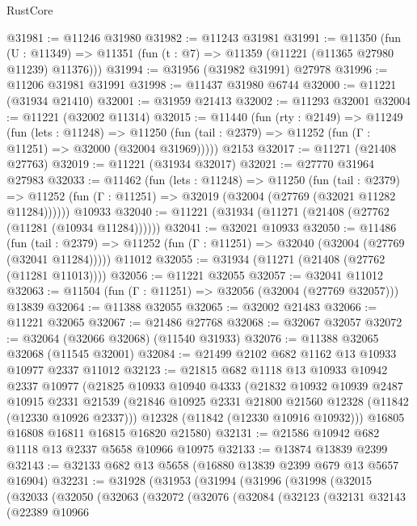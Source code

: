 \begin{lexlean}{RustCore}
\begin{coremodule}
@31981 := @11246 @31980
@31982 := @11243 @31981
@31991 := @11350
    (fun (U : @11349) => @11351 (fun (t : @7) => @11359 (@11221 (@11365 @27980 @11239) @11376)))
@31994 := @31956 (@31982 @31991) @27978
@31996 := @11206 @31981 @31991
@31998 := @11437 @31980 @6744
@32000 := @11221 (@31934 @21410)
@32001 := @31959 @21413
@32002 := @11293 @32001
@32004 := @11221 (@32002 @11314)
@32015 := @11440
    (fun (rty : @2149) =>
    @11249
      (fun (lets : @11248) =>
      @11250 (fun (tail : @2379) => @11252 (fun (Γ : @11251) => @32000 (@32004 @31969)))))
    @2153
@32017 := @11271 (@21408 @27763)
@32019 := @11221 (@31934 @32017)
@32021 := @27770 @31964 @27983
@32033 := @11462
    (fun (lets : @11248) =>
    @11250
      (fun (tail : @2379) =>
      @11252 (fun (Γ : @11251) => @32019 (@32004 (@27769 (@32021 @11282 @11284))))))
    @10933
@32040 := @11221 (@31934 (@11271 (@21408 (@27762 (@11281 (@10934 @11284))))))
@32041 := @32021 @10933
@32050 := @11486
    (fun (tail : @2379) => @11252 (fun (Γ : @11251) => @32040 (@32004 (@27769 (@32041 @11284)))))
    @11012
@32055 := @31934 (@11271 (@21408 (@27762 (@11281 @11013))))
@32056 := @11221 @32055
@32057 := @32041 @11012
@32063 := @11504 (fun (Γ : @11251) => @32056 (@32004 (@27769 @32057))) @13839
@32064 := @11388 @32055
@32065 := @32002 @21483
@32066 := @11221 @32065
@32067 := @21486 @27768
@32068 := @32067 @32057
@32072 := @32064 (@32066 @32068) (@11540 @31933)
@32076 := @11388 @32065 @32068 (@11545 @32001)
@32084 := @21499 @2102 @682 @1162 @13 @10933 @10977 @2337 @11012
@32123 := @21815
    @682
    @1118
    @13
    @10933
    @10942
    @2337
    @10977
    (@21825
      @10933
      @10940
      @4333
      (@21832
        @10932
        @10939
        @2487
        @10915
        @2331
        @21539
        (@21846 @10925 @2331 @21800 @21560 @12328 (@11842 (@12330 @10926 @2337)))
        @12328
        (@11842 (@12330 @10916 @10932)))
      @16805
      @16808
      @16811
      @16815
      @16820
      @21580)
@32131 := @21586 @10942 @682 @1118 @13 @2337 @5658 @10966 @10975
@32133 := @13874 @13839 @2399
@32143 := @32133 @682 @13 @5658 (@16880 @13839 @2399 @679 @13 @5657 @16904)
@32231 := @31928
    (@31953
      (@31994
        (@31996
          (@31998
            (@32015
              (@32033
                (@32050
                  (@32063
                    (@32072
                      (@32076
                        (@32084
                          (@32123
                            (@32131
                              @32143
                              (@22389
                                @10966

\end{coremodule}
\end{lexlean}
